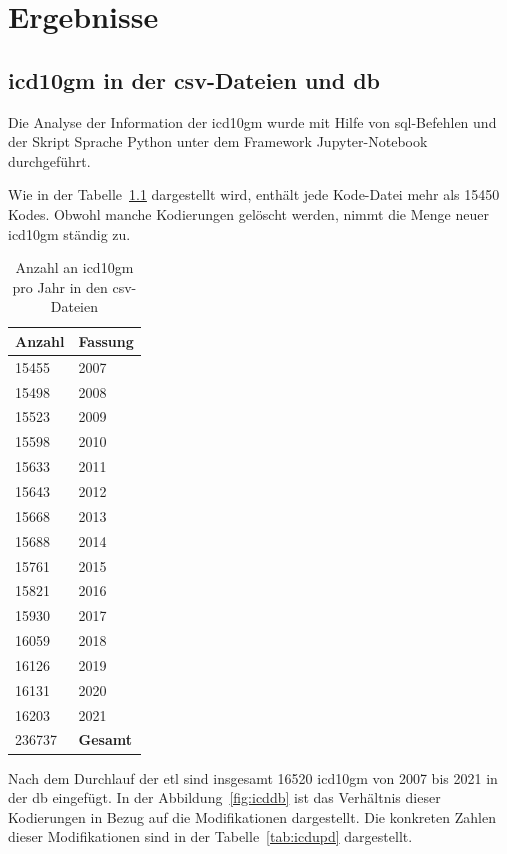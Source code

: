 \chapter{Ergebnisse} \label{ch:results}

\section{\acs{icd10gm} in der \acs{csv}-Dateien und \acs{db}} \label{sec:dataanalysis}
Die Analyse der Information der \ac{icd10gm} wurde mit Hilfe von \ac{sql}-Befehlen und der Skript Sprache Python unter dem Framework Jupyter-Notebook durchgeführt.

Wie in der Tabelle~\ref{tab:icdfiles} dargestellt wird, enthält jede Kode-Datei mehr als 15450 Kodes. Obwohl manche Kodierungen gelöscht werden, nimmt die Menge neuer \ac{icd10gm} ständig zu.

\begin{table}[ht]
	\centering
	\small
	\caption[\acs{icd10gm} in den \acs{csv}-Dateien]{Anzahl an \acs{icd10gm} pro Jahr in den \ac{csv}-Dateien}
	\label{tab:icdfiles}
	\begin{tabular}{|l|l|}
		\hline
	\rowcolor{lightgray} Anzahl & Fassung \\ \hline 
		15455 & 2007 \\ \hline
		15498 & 2008 \\ \hline
		15523 & 2009 \\ \hline
		15598 & 2010 \\ \hline
		15633 & 2011 \\ \hline
		15643 & 2012 \\ \hline
		15668 & 2013 \\ \hline
		15688 & 2014 \\ \hline
		15761 & 2015 \\ \hline
		15821 & 2016 \\ \hline
		15930 & 2017 \\ \hline
		16059 & 2018 \\ \hline
		16126 & 2019 \\ \hline
		16131 & 2020 \\ \hline
		16203 & 2021 \\ \hline
		\hline
		236737 & \textbf{Gesamt} \\ \hline
	\end{tabular}
	\end{table}

Nach dem Durchlauf der \ac{etl} sind insgesamt 16520 \ac{icd10gm} von 2007 bis 2021 in der \ac{db} eingefügt. In der Abbildung~\ref{fig:icddb} ist das Verhältnis dieser Kodierungen in Bezug auf die Modifikationen dargestellt. Die konkreten Zahlen dieser Modifikationen sind in der Tabelle~\ref{tab:icdupd} dargestellt. 
 
